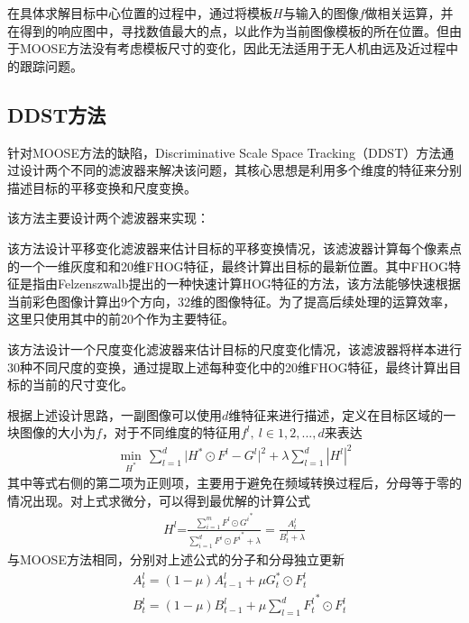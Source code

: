 在具体求解目标中心位置的过程中，通过将模板$H$与输入的图像$f$做相关运算，并在得到的响应图中，寻找数值最大的点，以此作为当前图像模板的所在位置。但由于MOOSE方法没有考虑模板尺寸的变化，因此无法适用于无人机由远及近过程中的跟踪问题。

 
\subsection{DDST方法} 
针对MOOSE方法的缺陷，Discriminative Scale Space Tracking（DDST）方法通过设计两个不同的滤波器来解决该问题，其核心思想是利用多个维度的特征来分别描述目标的平移变换和尺度变换。

该方法主要设计两个滤波器来实现：
\begin{compactenum}
	\item 该方法设计平移变化滤波器来估计目标的平移变换情况，该滤波器计算每个像素点的一个一维灰度和和20维FHOG特征，最终计算出目标的最新位置。其中FHOG特征是指由Felzenszwalb提出的一种快速计算HOG特征的方法，该方法能够快速根据当前彩色图像计算出9个方向，32维的图像特征。为了提高后续处理的运算效率，这里只使用其中的前20个作为主要特征。
	\item 该方法设计一个尺度变化滤波器来估计目标的尺度变化情况，该滤波器将样本进行30种不同尺度的变换，通过提取上述每种变化中的20维FHOG特征，最终计算出目标的当前的尺寸变化。
\end{compactenum}



根据上述设计思路，一副图像可以使用$d$维特征来进行描述，定义在目标区域的一块图像的大小为$f$，对于不同维度的特征用$f^l,\ l \in {1, 2, ..., d}$来表达
\begin{align}
\underset{{{H}^{*}}}{\mathop{\min }}\,\sum\limits_{l=1}^{d}{|{{H}^{*}}\odot{{F}^{l}}-{{G}^{l}}{{|}^{2}}}+\lambda \sum_{l=1}^{d}|H^{l}|^2
\end{align}
其中等式右侧的第二项为正则项，主要用于避免在频域转换过程后，分母等于零的情况出现。对上式求微分，可以得到最优解的计算公式
\begin{align}
H^l\text{=}\frac{\sum\limits_{i=1}^{m}{{{F}^{l}}\odot {G^{i}}^{{*}}}}{\sum\limits_{i=1}^{d}{{{F}^{i}}\odot {F^{i}}^{\text{*}}}+\lambda}=\frac{A^{l}_{t}}{B^{l}_{t}+\lambda}
\end{align}
与MOOSE方法相同，分别对上述公式的分子和分母独立更新
\begin{align}
\label{eq:moose_at_update}
&A_t^l=(1-\mu)A_{t-1}^{l}+\mu G_{t}^{*}\odot F_{t}^{l}\\
&B_t^l=(1-\mu)B_{t-1}^{l}+\mu \sum_{l=1}^{d}{F_{t}^{l}}^{*}\odot F_{t}^{l}
\end{align}

